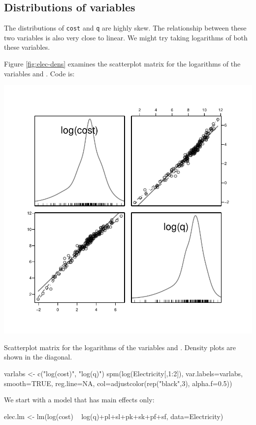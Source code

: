 \subsection*{Distributions of variables}

The distributions of \texttt{cost} and \texttt{q} are highly skew.
The relationship between these two variables is also very close to
linear.  We might try taking logarithms of both these variables.

Figure \ref{fig:elec-dens} examines the scatterplot matrix for the
logarithms of the variables  and .
\noindent
Code is:
\begin{marginfigure}[-3.5cm]
\begin{Schunk}


\centerline{\includegraphics[width=\textwidth]{figs/8-spm-cost-q-1} }

\end{Schunk}
  \caption{Scatterplot matrix for the logarithms of the variables
     and . Density plots are shown in the
    diagonal.\label{fig:elec-dens}}
\end{marginfigure}
\begin{Schunk}
\begin{Sinput}
varlabs <- c("log(cost)", "log(q)")
spm(log(Electricity[,1:2]), var.labels=varlabs,
    smooth=TRUE, reg.line=NA,
    col=adjustcolor(rep("black",3), alpha.f=0.5))
\end{Sinput}
\end{Schunk}
We start with a model that has main effects only:
\begin{Schunk}
\begin{Sinput}
elec.lm <- lm(log(cost) ~ log(q)+pl+sl+pk+sk+pf+sf,
              data=Electricity)
\end{Sinput}
\end{Schunk}

